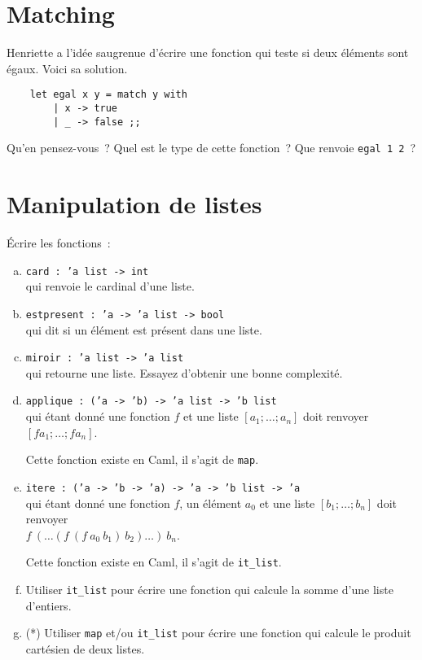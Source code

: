\documentclass[10pt,a4paper]{article}
\begin{document}
\section{Matching}
Henriette a l'idée saugrenue d'écrire une fonction qui teste si deux éléments sont égaux. Voici sa solution.
\begin{verbatim}    let egal x y = match y with
        | x -> true
        | _ -> false ;;\end{verbatim}
Qu'en pensez-vous~? Quel est le type de cette fonction~? Que renvoie \texttt{egal 1 2}~?

\section{Manipulation de listes}
Écrire les fonctions~:
\begin{enumerate}[a)]
\item \texttt{card : ’a list -> int}\\ qui renvoie le cardinal d'une liste.

\item \texttt{estpresent : ’a -> ’a list -> bool}\\ qui dit si un élément est présent dans une liste.

\item \texttt{miroir : ’a list -> ’a list}\\ qui retourne une liste. Essayez d'obtenir une bonne complexité.

\item \texttt{applique : (’a -> ’b) -> ’a list -> ’b list}\\
qui étant donné une fonction $f$ et une liste $[a_1;\dots ;a_n]$ doit renvoyer $[f a_1;\dots ;f a_n]$.

Cette fonction existe en Caml, il s'agit de \texttt{map}.

\item \texttt{itere : (’a -> ’b -> ’a) -> ’a -> ’b list -> ’a}\\
qui étant donné une fonction $f$, un élément $a_0$ et une liste $[b_1;\dots ;b_n]$ doit renvoyer \\$ f\  (\dots (f\ (f\ a_0\ b_1)\ b_2) \dots )\ b_n$.

Cette fonction existe en Caml, il s'agit de \texttt{it\_list}.

\item Utiliser \texttt{it\_list} pour écrire une fonction qui calcule la somme d'une liste d'entiers.

\item(*) Utiliser \texttt{map} et/ou \texttt{it\_list} pour écrire une fonction qui calcule le produit cartésien de deux listes.
\end{enumerate}
\end{document}
